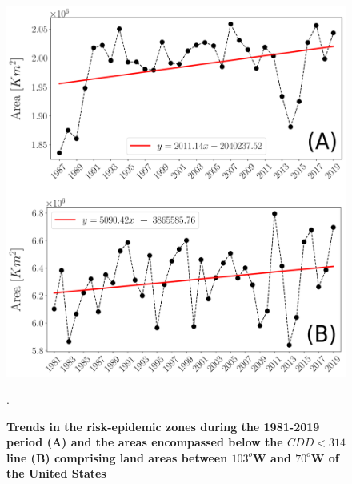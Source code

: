 \begin{figure}[H]
    \centering
    \includegraphics[width=\textwidth]{Figures/CDD_risk_evol_USA.png}
    \caption[Comparison of risk areas and low CDD areas]{\textbf{Trends in the
            risk-epidemic zones during the 1981-2019
            period (A) and the areas encompassed below the $CDD < 314$ line (B)
            comprising
            land areas between $103^o$W and $70^o$W of the United States}}.
    \label{fig:sup_CDD_evol} %
\end{figure}

